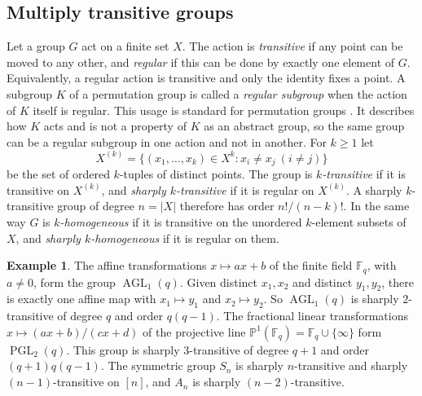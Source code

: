 \documentclass[12pt,letterpaper]{article}
\numberwithin{equation}{section}
\theoremstyle{definition}
\newtheorem{example}[theorem]{Example}
\DeclareMathOperator{\agll}{AGL}
\DeclareMathOperator{\pgll}{PGL}
\begin{document}
\subsection*{Multiply transitive groups}
Let a group $G$ act on a finite set $X$. The action is \emph{transitive} if any point can be moved to any other, and \emph{regular} if this can be done by exactly one element of $G$. Equivalently, a regular action is transitive and only the identity fixes a point. A subgroup $K$ of a permutation group is called a \emph{regular subgroup} when the action of $K$ itself is regular. This usage is standard for permutation groups \cite{DM96}. It describes how $K$ acts and is not a property of $K$ as an abstract group, so the same group can be a regular subgroup in one action and not in another. For $k\geq1$ let
\[
X^{(k)}=\{(x_1,\ldots,x_k)\in X^k:x_i\ne x_j\ (i\ne j)\}
\]
be the set of ordered $k$-tuples of distinct points. The group is \emph{$k$-transitive} if it is transitive on $X^{(k)}$, and \emph{sharply $k$-transitive} if it is regular on $X^{(k)}$. A sharply $k$-transitive group of degree $n=|X|$ therefore has order $n!/(n-k)!$. In the same way $G$ is \emph{$k$-homogeneous} if it is transitive on the unordered $k$-element subsets of $X$, and \emph{sharply $k$-homogeneous} if it is regular on them.
\begin{example}\label{ex:aglpgl}
The affine transformations $x\mapsto ax+b$ of the finite field $\mathbb F_q$, with $a\ne0$, form the group $\agll_1(q)$. Given distinct $x_1,x_2$ and distinct $y_1,y_2$, there is exactly one affine map with $x_1\mapsto y_1$ and $x_2\mapsto y_2$. So $\agll_1(q)$ is sharply $2$-transitive of degree $q$ and order $q(q-1)$. The fractional linear transformations $x\mapsto (ax+b)/(cx+d)$ of the projective line $\mathbb P^1(\mathbb F_q)=\mathbb F_q\cup\{\infty\}$ form $\pgll_2(q)$. This group is sharply $3$-transitive of degree $q+1$ and order $(q+1)q(q-1)$. The symmetric group $S_n$ is sharply $n$-transitive and sharply $(n-1)$-transitive on $[n]$, and $A_n$ is sharply $(n-2)$-transitive.
\end{example}
\end{document}
